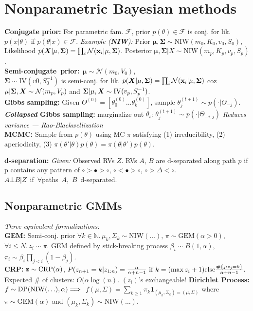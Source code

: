 \section*{Nonparametric Bayesian methods}
\textbf{Conjugate prior:} For parametric fam. $\mathcal{F}$, prior $p(\theta)\in\mathcal{F}$ is conj. for lik. $p(x|\theta)$ if $p(\theta|x)\in\mathcal{F}$.
\emph{Example (\textbf{NIW}):} Prior $\mathbf{\mu},\mathbf{\Sigma}\sim\mathrm{NIW}(m_0,K_0,v_0,S_0)$, Likelihood
$p({\bm{X}}|\mathbf{\mu},\mathbf{\Sigma}) = \prod_i \mathcal{N}({\mathbf{x}}_i|\mathbf{\mu},\mathbf{\Sigma})$.
Posterior $\mathbf{\mu},\mathbf{\Sigma}|X\sim\mathrm{NIW}(m_p,K_p,v_p,S_p)$.\\
\mbox{\textbf{Semi-conjugate prior:} $\mathbf{\mu}\sim\mathcal{N}(m_0,V_0)$,}\\$\mathbf{\Sigma}\sim\mathrm{IV}(v0,S_0^{-1})$ is semi-conj. for lik. $p({\bm{X}}|\mathbf{\mu},\mathbf{\Sigma}) = \prod_i \mathcal{N}({\mathbf{x}}_i|\mathbf{\mu},\mathbf{\Sigma})$ coz $\mathbf{\mu}|\mathbf{\Sigma},{\bm{X}}\sim\mathcal{N}(m_p,V_p)$ and $\mathbf{\Sigma}|\mathbf{\mu},{\bm{X}}\sim\mathrm{IV}(v_p,S_p^{-1})$.\\
\textbf{Gibbs sampling:} Given $\Theta^{(0)} = [\theta^{(0)}_0\ldots\theta^{(0)}_k]$, sample $\theta_j^{(t+1)}\sim p(\cdot|\Theta_{-j})$.\\
\textbf{\emph{Collapsed} Gibbs sampling:} marginalize out $\theta_i$: $\theta_j^{(t+1)}\sim p(\cdot|\Theta_{-i,j})$ \emph{Reduces variance --- Rao-Blackwellization}\\
\textbf{MCMC:} Sample from $p(\theta)$ using MC $\pi$ satisfying
(1) irreducibility, (2) aperiodicity, (3) $\pi(\theta'|\theta)p(\theta) = \pi(\theta|\theta')p(\theta)$.

\textbf{d-separation:} \emph{Given:} Observed RVs $Z$.
RVs $A$, $B$ are d-separated along path $p$ if p contains
any pattern of $\circ>\bullet>\circ$, $\circ<\bullet>\circ$, $\circ>\Delta<\circ$.\\
\mbox{$A \bot B | Z$ if $\forall$paths $A$, $B$ d-separated.}

\subsection*{Nonparametric GMMs}
\emph{Three equivalent formalizations:}\\
\textbf{GEM:} Semi-conj. prior $\forall k\in\mathbb{N}.\,\mu_k,\Sigma_k\sim\mathrm{NIW}(\ldots)$, $\pi\sim\mathrm{GEM}(\alpha > 0)$, $\forall i\leq N.\,z_i\sim\pi$.
GEM defined by stick-breaking process $\beta_i\sim B(1,\alpha)$, $\pi_i\sim\beta_i\prod_{j<i}(1-\beta_j)$.\\
\textbf{CRP:} ${\mathbf{z}}\sim\mathrm{CRP}(\alpha)$, $P(z_{n+1}=k|z_{1:n})= \frac{\alpha}{\alpha+n-1} {\color{black}\textrm{ if }} k=(\max z_i+1) {\color{black}\mathrm{ else }} \frac{\#\{j:z_j=k\}}{\alpha+n-1}$. Expected \# of clusters: $O(\alpha\log(n)$. $(z_i)$'s exchangeable! 
\textbf{Dirichlet Process:} $f\sim\mathrm{DP}(\mathrm{NIW}(\ldots),\alpha) {\color{black}\implies} $
$f(\mu,\Sigma)=\sum_{k\geq1}\pi_k\mathbf{1}_{(\mu_k,\Sigma_k)=(\mu,\Sigma)}$ where $\pi\sim\mathrm{GEM}(\alpha)$ and $(\mu_k,\Sigma_k)\sim\mathrm{NIW}(\ldots)$.